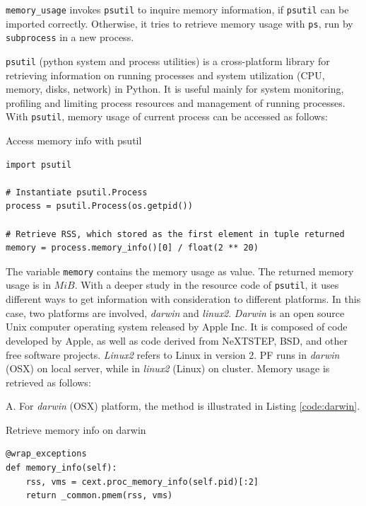 \documentclass[10pt,twoside,openright,logo]{report}
\begin{document}
\texttt{memory_usage} invokes \texttt{psutil} to inquire memory information, if \texttt{psutil} can be imported correctly. Otherwise, it tries to retrieve memory usage with \texttt{ps}, run by \texttt{subprocess} in a new process.

\texttt{psutil} (python system and process utilities) is a cross-platform library for retrieving information on running processes and system utilization (CPU, memory, disks, network) in Python. It is useful mainly for system monitoring, profiling and limiting process resources and management of running processes.
With \texttt{psutil}, memory usage of current process can be accessed as follows:

\begin{listing}
\caption{Access memory info with psutil}
\label{code:psutil}
\begin{verbatim}
import psutil

# Instantiate psutil.Process
process = psutil.Process(os.getpid())

# Retrieve RSS, which stored as the first element in tuple returned
memory = process.memory_info()[0] / float(2 ** 20)
\end{verbatim}
\end{listing}

The variable \texttt{memory} contains the memory usage as value. The returned memory usage is in $MiB$.
With a deeper study in the resource code of \texttt{psutil}, it uses different ways to get information with consideration to different platforms. In this case, two platforms are involved, \textit{darwin} and \textit{linux2}. \textit{Darwin} is an open source Unix computer operating system released by Apple Inc. It is composed of code developed by Apple, as well as code derived from NeXTSTEP, BSD, and other free software projects. \textit{Linux2} refers to Linux in version 2. PF runs in \textit{darwin} (OSX) on local server, while in \textit{linux2} (Linux) on cluster.
Memory usage is retrieved as follows:

\noindent
A. For \textit{darwin} (OSX) platform, the method is illustrated in Listing \ref{code:darwin}.
\begin{listing}
\caption{Retrieve memory info on darwin}
\label{code:darwin}
\begin{verbatim}
@wrap_exceptions
def memory_info(self):
    rss, vms = cext.proc_memory_info(self.pid)[:2]
    return _common.pmem(rss, vms)
\end{verbatim}
\end{listing}
\end{document}
